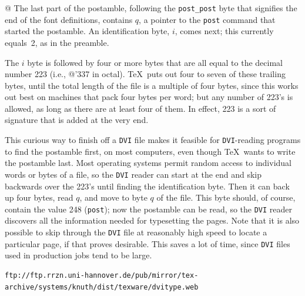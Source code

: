 \documentclass[10pt, a4paper, english]{article}
\begin{document}
@ The last part of the postamble, following the \texttt{post\_post} byte 
that signifies the end of the font definitions, 
contains $q$, a pointer to the \texttt{post} command 
that started the postamble.  
An identification byte, $i$, comes next; 
this currently equals~2, as in the preamble.

The $i$ byte is followed by four or more bytes that are all equal to
the decimal number 223 (i.e., @'337 in octal). \TeX\ puts out four to seven of
these trailing bytes, until the total length of the file is a multiple of
four bytes, since this works out best on machines that pack four bytes per
word; but any number of 223's is allowed, as long as there are at least four
of them. In effect, 223 is a sort of signature that is added at the very end.


This curious way to finish off a \texttt{DVI} file makes it feasible for
\texttt{DVI}-reading programs to find the postamble first, on most computers,
even though \TeX\ wants to write the postamble last. Most operating
systems permit random access to individual words or bytes of a file, so
the \texttt{DVI} reader can start at the end and skip backwards over the 223's
until finding the identification byte. Then it can back up four bytes, read
$q$, and move to byte $q$ of the file. This byte should, of course,
contain the value 248 (\texttt{post}); now the postamble can be read, so the
\texttt{DVI} reader discovers all the information needed for typesetting the
pages. Note that it is also possible to skip through the \texttt{DVI} file at
reasonably high speed to locate a particular page, if that proves
desirable. 
This saves a lot of time, 
since \texttt{DVI} files used in production jobs tend to be large.

\begin{Verbatim}[fontsize=\scriptsize]
ftp://ftp.rrzn.uni-hannover.de/pub/mirror/tex-archive/systems/knuth/dist/texware/dvitype.web
\end{Verbatim}


{}%
\end{document}
